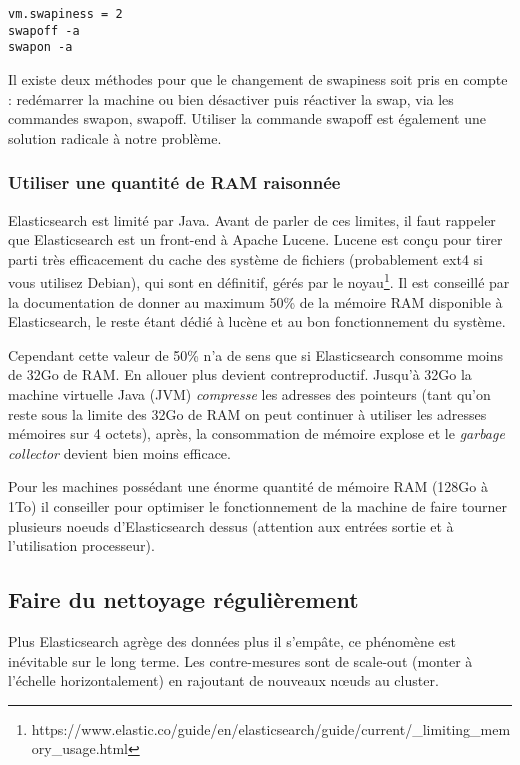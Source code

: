 {\begin{lstlisting}[style=code,label={lst:configswapiness},caption={Configuration swapiness}]
vm.swapiness = 2
swapoff -a
swapon -a
\end{lstlisting}
Il existe deux méthodes pour que le changement de swapiness soit pris en compte :
redémarrer la machine ou bien désactiver puis réactiver la swap, via les commandes
swapon, swapoff. Utiliser la commande swapoff est également une solution radicale 
à notre problème.

\subsubsection{Utiliser une quantité de RAM raisonnée}
Elasticsearch est limité par Java. Avant de parler de ces limites, il faut rappeler 
que Elasticsearch est un front-end à Apache Lucene. Lucene est conçu pour tirer 
parti très efficacement du cache des système de fichiers (probablement ext4 si 
vous utilisez Debian), qui sont en définitif, gérés par le 
noyau\footnote{https://www.elastic.co/guide/en/elasticsearch/guide/current/\_limiting\_memory\_usage.html}.
Il est conseillé par la documentation de donner au maximum 50\% de la mémoire RAM
disponible à Elasticsearch, le reste étant dédié à lucène et au bon fonctionnement
du système.

Cependant cette valeur de 50\% n'a de sens que si Elasticsearch consomme moins de 
32Go de RAM. En allouer plus devient contreproductif. Jusqu'à 32Go
la machine virtuelle Java (JVM) \textit{compresse} les adresses des pointeurs 
(tant qu'on reste sous la limite des 32Go de RAM on peut continuer à utiliser les 
adresses mémoires sur 4 octets), après, la consommation de mémoire explose et le
\textit{garbage collector} devient bien moins efficace.

Pour les machines possédant une énorme quantité de mémoire RAM (128Go à 1To)
il conseiller pour optimiser le fonctionnement de la machine de faire tourner plusieurs
noeuds d'Elasticsearch dessus (attention aux entrées sortie et à l'utilisation processeur).

\subsection{Faire du nettoyage régulièrement}
Plus Elasticsearch agrège des données plus il s'empâte, ce phénomène est inévitable 
sur le long terme. Les contre-mesures sont de scale-out (monter à l'échelle horizontalement)
en rajoutant de nouveaux nœuds au cluster. 

}
